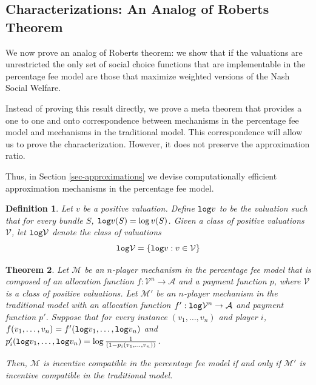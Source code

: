 \documentclass{article}
\newtheorem{theorem}{Theorem}\newtheorem{lemma}[theorem]{Lemma}\newtheorem{proposition}[theorem]{Proposition}\newtheorem{corollary}[theorem]{Corollary}\newtheorem{definition}[theorem]{Definition}\newtheorem{claim}[theorem]{Claim}\newtheorem*{claim*}{Claim}\newenvironment{subproof}{\begin{proof}[Proof of claim]}{\end{proof}}
\newcommand{\cM}{{\mathcal M}}
\newcommand{\cV}{{\mathcal V}}
\begin{document}
\subsection{Characterizations: An Analog of Roberts Theorem}\label{subsec-analog}

We now prove an analog of Roberts theorem: we show that if the valuations are unrestricted the only set of social choice functions that are implementable in the percentage fee model are those that maximize weighted versions of the Nash Social Welfare.

Instead of proving this result directly, we prove a meta theorem that provides a one to one and onto correspondence between mechanisms in the percentage fee model and mechanisms in the traditional model. This correspondence will allow us to prove the characterization. However, it does not preserve the approximation ratio.

Thus, in Section \ref{sec-approximations} we devise computationally efficient approximation mechanisms in the percentage fee model.









\begin{definition}
Let $v$ be a positive valuation. Define ${\tt log}v$ to be the valuation such that for every bundle $S$, ${\tt log}v(S)=\log v(S)$. Given a class of positive valuations $\cV$, let ${\tt log} \cV$ denote the class of valuations
$$ {\tt log} \cV = \{ {\tt log} v: v \in \cV \}$$
\end{definition}

\begin{theorem}\label{thm:meta}
Let $\cM$ be an $n$-player mechanism in the percentage fee model that is composed of an allocation function $f:\mathcal V^n\rightarrow \mathcal A$ and a payment function $p$, where $\mathcal V$ is a class of positive valuations. Let $\cM'$ be an $n$-player mechanism in the traditional model with an allocation function $f':{\tt log}\mathcal V^n\rightarrow \mathcal A$ and payment function $p'$. Suppose that for every instance $(v_1,\ldots, v_n)$ and player $i$, $f(v_1,\ldots, v_n)=f'({\tt log}v_1,\ldots,{\tt log} v_n)$ and $p'_i({\tt log}v_1,\ldots, {\tt log}v_n)=\log \frac 1 {(1-p_i(v_1,\ldots, v_n))}$. 

Then, $\cM$ is incentive compatible in the percentage fee model if and only if $\cM'$ is incentive compatible in the traditional model.
\end{theorem}
\end{document}
